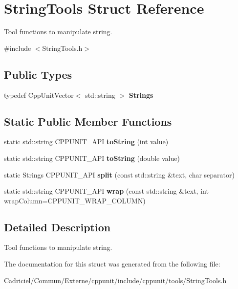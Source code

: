 \hypertarget{struct_string_tools}{}\section{String\+Tools Struct Reference}
\label{struct_string_tools}


Tool functions to manipulate string.  




{\ttfamily \#include $<$String\+Tools.\+h$>$}

\subsection*{Public Types}
\begin{DoxyCompactItemize}
\item 
typedef Cpp\+Unit\+Vector$<$ std\+::string $>$ {\bfseries Strings}\hypertarget{struct_string_tools_ab01d065d80c39015955e9f765cd19921}{}\label{struct_string_tools_ab01d065d80c39015955e9f765cd19921}

\end{DoxyCompactItemize}
\subsection*{Static Public Member Functions}
\begin{DoxyCompactItemize}
\item 
static std\+::string C\+P\+P\+U\+N\+I\+T\+\_\+\+A\+PI {\bfseries to\+String} (int value)\hypertarget{struct_string_tools_a2b4a4cbbfa69a2c28c71bd519ba71e5c}{}\label{struct_string_tools_a2b4a4cbbfa69a2c28c71bd519ba71e5c}

\item 
static std\+::string C\+P\+P\+U\+N\+I\+T\+\_\+\+A\+PI {\bfseries to\+String} (double value)\hypertarget{struct_string_tools_adfab22bf90b73231f635aa1ae299d4c4}{}\label{struct_string_tools_adfab22bf90b73231f635aa1ae299d4c4}

\item 
static Strings C\+P\+P\+U\+N\+I\+T\+\_\+\+A\+PI {\bfseries split} (const std\+::string \&text, char separator)\hypertarget{struct_string_tools_ac3c3d30a35c82c1d5fcb54e915130767}{}\label{struct_string_tools_ac3c3d30a35c82c1d5fcb54e915130767}

\item 
static std\+::string C\+P\+P\+U\+N\+I\+T\+\_\+\+A\+PI {\bfseries wrap} (const std\+::string \&text, int wrap\+Column=C\+P\+P\+U\+N\+I\+T\+\_\+\+W\+R\+A\+P\+\_\+\+C\+O\+L\+U\+MN)\hypertarget{struct_string_tools_a02d43819e61394264c3e75c24433a057}{}\label{struct_string_tools_a02d43819e61394264c3e75c24433a057}

\end{DoxyCompactItemize}


\subsection{Detailed Description}
Tool functions to manipulate string. 

The documentation for this struct was generated from the following file\+:\begin{DoxyCompactItemize}
\item 
Cadriciel/\+Commun/\+Externe/cppunit/include/cppunit/tools/String\+Tools.\+h\end{DoxyCompactItemize}
